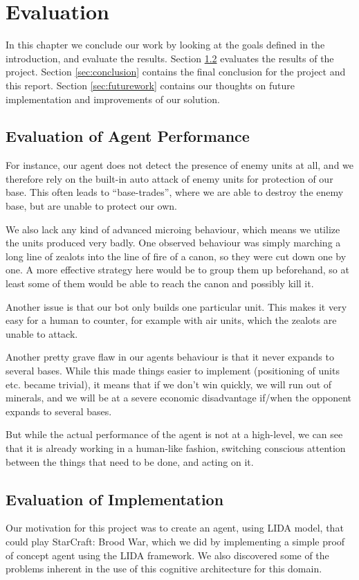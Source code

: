 
\chapter{Evaluation}
In this chapter we conclude our work by looking at the goals defined in the
introduction, and evaluate the results.
Section \ref{sec:evalres} evaluates the results of the project.
Section \ref{sec:conclusion} contains the final conclusion for the project and this report. 
Section \ref{sec:futurework} contains our thoughts on future implementation and improvements of our solution.


\section{Evaluation of Agent Performance}
For instance, our agent does not detect the presence of enemy units at all, and we therefore rely on the built-in auto attack of enemy units for protection of our base. This often leads to ``base-trades'', where we are able to destroy the enemy base, but are unable to protect our own.

We also lack any kind of advanced microing behaviour, which means we utilize the units produced very badly. One observed behaviour was simply marching a long line of zealots into the line of fire of a canon, so they were cut down one by one. A more effective strategy here would be to group them up beforehand, so at least some of them would be able to reach the canon and possibly kill it.

Another issue is that our bot only builds one particular unit. This makes it very easy for a human to counter, for example with air units, which the zealots are unable to attack.

Another pretty grave flaw in our agents behaviour is that it never expands to several bases. While this made things easier to implement (positioning of units etc. became trivial), it means that if we don't win quickly, we will run out of minerals, and we will be at a severe economic disadvantage if/when the opponent expands to several bases.

But while the actual performance of the agent is not at a high-level, we can see that it is already working in a human-like fashion, switching conscious attention between the things that need to be done, and acting on it.

\section{Evaluation of Implementation}
\label{sec:evalres}
Our motivation for this project was to create an agent, using LIDA model, that could play StarCraft: Brood War, which we did by implementing a simple proof of concept agent using the LIDA framework. We also discovered some of the problems inherent in the use of this cognitive architecture for this domain.

